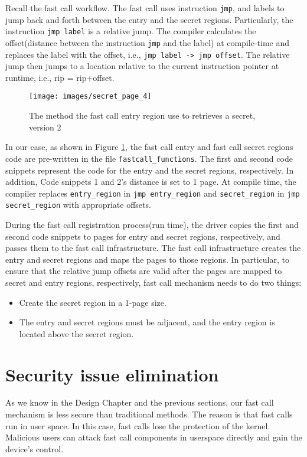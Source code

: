 Recall the fast call workflow. The fast call uses instruction \verb|jmp|, 
and labels to jump back and forth between the entry and the secret regions. 
Particularly, the instruction \verb|jmp label| is a relative jump. 
The compiler calculates the offset(distance between the instruction \verb|jmp|
and the label) at compile-time and replaces the label with the offset, i.e., 
\verb|jmp label -> jmp offset|. The relative jump then jumps to a location relative to the current 
instruction pointer at runtime, i.e., rip = rip+offset.
\begin{figure}[H]
  \centering
  \texttt{[image: images/secret\_page\_4]}
  \caption[Short description]{The method the fast call entry region use to retrieves a 
  secret, version 2}
   \label{fig:secret_page_4}
\end{figure}
In our case, as shown in Figure \ref{fig:secret_page_4},  the fast call entry and fast call 
secret regions code are pre-written in the file \verb|fastcall_functions|. 
The first and second code snippets represent the code for the entry and 
the secret regions, respectively. In addition,  Code snippets 1 and 2's 
distance is set to 1 page.  At compile time, the compiler replaces
\verb|entry_region| in \verb|jmp entry_region| and \verb|secret_region| in \verb|jmp secret_region|  
with appropriate offsets.  

During the fast call registration process(run time), 
the driver copies the first and second code snippets to pages for entry and secret 
regions, respectively, and passes them to the fast call infrastructure. 
The fast call infrastructure creates the entry and secret regions and maps the 
pages to those regions.  In particular, to ensure that the relative jump 
offsets are valid after the pages are mapped to secret and entry regions, 
respectively, fast call mechanism needs to do two things:


\begin{itemize}
  \item Create the secret region in a 1-page size.
  \item The entry and secret regions must be adjacent, and the entry region is located above the secret region.
\end{itemize}


\section{Security issue elimination}

As we know in the Design Chapter and the previous sections, our fast call 
mechanism is less secure than traditional methods. The reason is that fast 
calls run in user space. In this case, fast calls lose the protection of the kernel. Malicious users can attack fast call components in userspace directly and gain the device's control.



